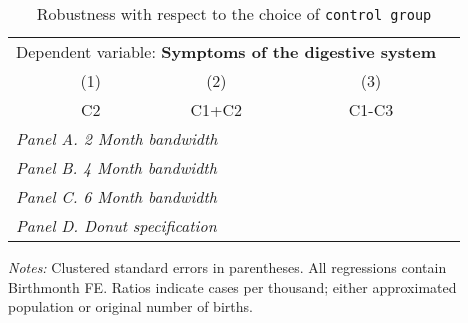  \begin{table}[H] \begin{threeparttable} \centering \caption{Robustness with respect to the choice of \texttt{control group}} {\def\sym#1{\ifmmode^{#1}\else\(^{#1}\)\fi} \begin{tabular}{l*{4}{c}} \toprule \multicolumn{4}{c}{Dependent variable: \textbf{Symptoms of the digestive system}} \\ \cmidrule(lr){2-4}
            &\multicolumn{1}{c}{(1)}&\multicolumn{1}{c}{(2)}&\multicolumn{1}{c}{(3)}\\
            &\multicolumn{1}{c}{C2}&\multicolumn{1}{c}{C1+C2}&\multicolumn{1}{c}{C1-C3}\\
\midrule
 \multicolumn{4}{l}{\emph{Panel A. 2 Month bandwidth}} \\    \midrule\multicolumn{4}{l}{\emph{Panel B. 4 Month bandwidth}} \\    \midrule\multicolumn{4}{l}{\emph{Panel C. 6 Month bandwidth}} \\    \midrule\multicolumn{4}{l}{\emph{Panel D. Donut specification}} \\    
\bottomrule \end{tabular} } \begin{tablenotes} \item \scriptsize \emph{Notes:} Clustered standard errors in parentheses. All regressions contain Birthmonth FE. Ratios indicate cases per thousand; either approximated population or original number of births. \end{tablenotes} \end{threeparttable} \end{table} 
